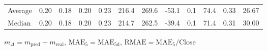 \begin{threeparttable}
{\begin{tabular}{lrrrrrrrrrrr}
Average &          0.20 &          0.18 &          0.20 &        0.23 &               216.4 &               269.6 &      -53.1 &                 0.1 &             74.4 &            0.33 &                  26.67 \\
 Median &          0.20 &          0.18 &          0.20 &        0.23 &               214.7 &               262.5 &      -39.4 &                 0.1 &             71.4 &            0.31 &                  30.00 \\
\bottomrule
\end{tabular}
}
\begin{tablenotes}\footnotesize
\item $m_\Delta=m_{\text{pred}}-m_{\text{real}}$,
$\mathrm{MAE}_5=\mathrm{MAE}_{5\text{d}}$,
$\mathrm{RMAE}=\mathrm{MAE}_5/\text{Close}$
\end{tablenotes}
\end{threeparttable}
\endgroup

